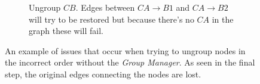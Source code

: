 \begin{figure}[h]
  \begin{subfigure}[t]{0.5\textwidth}
    \centering
    \caption{Ungroup $CB$. Edges between $CA\rightarrow B1$ and $CA\rightarrow B2$ will try to be restored but because there's no $CA$ in the graph these will fail.}
  \end{subfigure}
  \caption{An example of issues that occur when trying to ungroup nodes in the incorrect order without the \textit{Group Manager}. As seen in the final step, the original edges connecting the nodes are lost.}
\end{figure}


